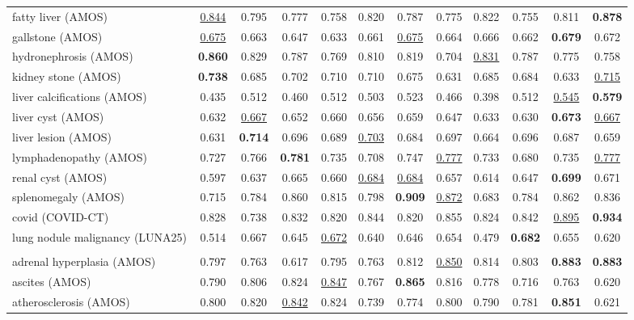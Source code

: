 \begin{minipage}{\textwidth}
{\begin{tabular}{@{}lccccccccccc@{}}
fatty liver (AMOS) & \underline{0.844} & 0.795 & 0.777 & 0.758 & 0.820 & 0.787 & 0.775 & 0.822 & 0.755 & 0.811 & \textbf{0.878} \\
gallstone (AMOS) & \underline{0.675} & 0.663 & 0.647 & 0.633 & 0.661 & \underline{0.675} & 0.664 & 0.666 & 0.662 & \textbf{0.679} & 0.672 \\
hydronephrosis (AMOS) & \textbf{0.860} & 0.829 & 0.787 & 0.769 & 0.810 & 0.819 & 0.704 & \underline{0.831} & 0.787 & 0.775 & 0.758 \\
kidney stone (AMOS) & \textbf{0.738} & 0.685 & 0.702 & 0.710 & 0.710 & 0.675 & 0.631 & 0.685 & 0.684 & 0.633 & \underline{0.715} \\
liver calcifications (AMOS) & 0.435 & 0.512 & 0.460 & 0.512 & 0.503 & 0.523 & 0.466 & 0.398 & 0.512 & \underline{0.545} & \textbf{0.579} \\
liver cyst (AMOS) & 0.632 & \underline{0.667} & 0.652 & 0.660 & 0.656 & 0.659 & 0.647 & 0.633 & 0.630 & \textbf{0.673} & \underline{0.667} \\
liver lesion (AMOS) & 0.631 & \textbf{0.714} & 0.696 & 0.689 & \underline{0.703} & 0.684 & 0.697 & 0.664 & 0.696 & 0.687 & 0.659 \\
lymphadenopathy (AMOS) & 0.727 & 0.766 & \textbf{0.781} & 0.735 & 0.708 & 0.747 & \underline{0.777} & 0.733 & 0.680 & 0.735 & \underline{0.777} \\
renal cyst (AMOS) & 0.597 & 0.637 & 0.665 & 0.660 & \underline{0.684} & \underline{0.684} & 0.657 & 0.614 & 0.647 & \textbf{0.699} & 0.671 \\
splenomegaly (AMOS) & 0.715 & 0.784 & 0.860 & 0.815 & 0.798 & \textbf{0.909} & \underline{0.872} & 0.683 & 0.784 & 0.862 & 0.836 \\
covid (COVID-CT) & 0.828 & 0.738 & 0.832 & 0.820 & 0.844 & 0.820 & 0.855 & 0.824 & 0.842 & \underline{0.895} & \textbf{0.934} \\
lung nodule malignancy (LUNA25) & 0.514 & 0.667 & 0.645 & \underline{0.672} & 0.640 & 0.646 & 0.654 & 0.479 & \textbf{0.682} & 0.655 & 0.620 \\
\addlinespace
\multicolumn{12}{@{}l}{\textit{joint (26\,000 steps)}} \\
adrenal hyperplasia (AMOS) & 0.797 & 0.763 & 0.617 & 0.795 & 0.763 & 0.812 & \underline{0.850} & 0.814 & 0.803 & \textbf{0.883} & \textbf{0.883} \\
ascites (AMOS) & 0.790 & 0.806 & 0.824 & \underline{0.847} & 0.767 & \textbf{0.865} & 0.816 & 0.778 & 0.716 & 0.763 & 0.620 \\
atherosclerosis (AMOS) & 0.800 & 0.820 & \underline{0.842} & 0.824 & 0.739 & 0.774 & 0.800 & 0.790 & 0.781 & \textbf{0.851} & 0.621 \\

\end{tabular}}
\end{minipage}
